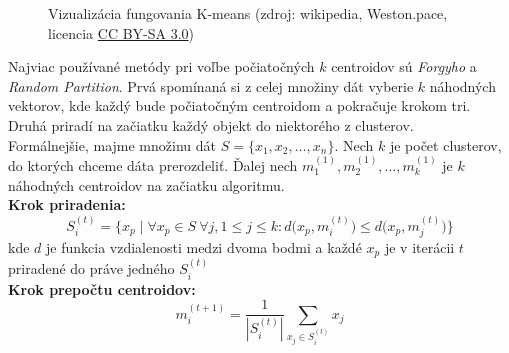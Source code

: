 \begin{figure}[h]
	\begin{center}
		\quad
		\quad
		\quad
	\end{center}
	\caption[Vizualizácia fungovania K-means]{Vizualizácia fungovania K-means
		(zdroj: wikipedia, Weston.pace, licencia \href{https://creativecommons.org/licenses/by-sa/3.0/}{CC BY-SA 3.0})}
	\label{img:kmeanssteps}
\end{figure}

Najviac používané metódy pri voľbe počiatočných $k$ centroidov sú \textit{Forgyho} a
\textit{Random Partition}. Prvá spomínaná si z celej množiny dát vyberie $k$ náhodných
vektorov, kde každý bude počiatočným centroidom a pokračuje krokom tri.
Druhá priradí na začiatku každý objekt do niektorého z clusterov. \\

Formálnejšie, majme množinu dát $S=\{x_1, x_2, \ldots , x_n\}$. Nech $k$ je počet
clusterov, do ktorých chceme dáta prerozdeliť. Ďalej nech
$m_1^{(1)}, m_2^{(1)}, \ldots, m_k^{(1)}$ je $k$ náhodných centroidov na začiatku
algoritmu.\\
\textbf{Krok priradenia:}
$$S_i^{(t)}=\Big\{ x_p \mid
\forall x_p\in S~
\forall j, 1\leq j \leq k:
{d\big(x_p, m_i^{(t)}\big)} \leq 
{d\big(x_p, m_j^{(t)}\big)}\Big\}$$
kde $d$ je funkcia vzdialenosti medzi dvoma bodmi a každé $x_p$ je v iterácii $t$
priradené do práve jedného $S_i^{(t)}$ \\
\textbf{Krok prepočtu centroidov:}
$$m_i^{(t+1)}=\frac{1}{|S_i^{(t)}|} \sum_{x_j\in S_i^{(t)}} x_j$$

